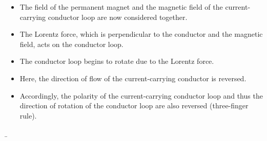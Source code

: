 \begin{frame}
{		\begin{minipage}{0.74\textwidth}
			\begin{itemize}
				\item The field of the permanent magnet and the magnetic field of the current-carrying conductor loop are now considered together.
				\item The Lorentz force, which is perpendicular to the conductor and the magnetic field, acts on the conductor loop.
				\item The conductor loop begins to rotate due to the Lorentz force.%
			\end{itemize}%
		\end{minipage}
		\begin{minipage}{0.25\textwidth}
		\end{minipage}
		\begin{minipage}{0.74\textwidth}
			\begin{itemize}
				\item Here, the direction of flow of the current-carrying conductor is reversed.
				\item Accordingly, the polarity of the current-carrying conductor loop and thus the direction of rotation of the conductor loop are also reversed (three-finger rule).
			\end{itemize}
		\end{minipage}
	}
	\b{ %
		\begin{columns}
			\pause
			\pause
			\pause
\end{columns}}
\end{frame}
